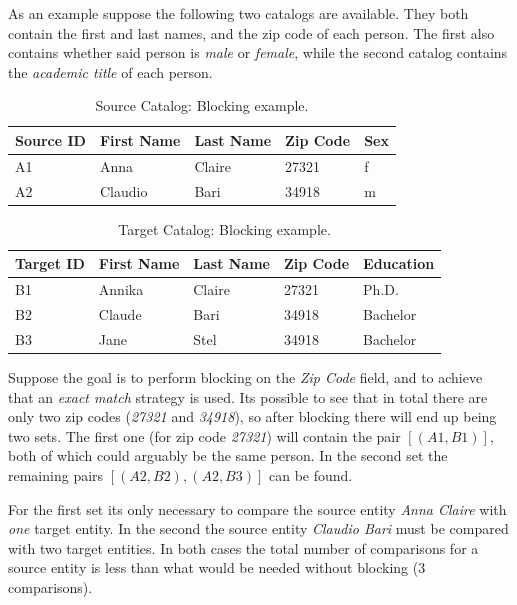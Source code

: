 \documentclass[epsfig,a4paper,11pt,titlepage,twoside,openany]{book}
\begin{document}
As an example suppose the following two catalogs are available. They both contain the
first and last names, and the zip code of each person. The first also contains
whether said person is \textit{male} or \textit{female}, while the second catalog
contains the \textit{academic title} of each person.

\begin{table}[H]
  \centering
  \begin{tabular}{l|l|l|l|l}
    Source ID & First Name & Last Name & Zip Code & Sex \\ \hline
    A1        & Anna       & Claire    & 27321    & f   \\
    A2        & Claudio    & Bari      & 34918    & m  
  \end{tabular}
  \caption{Source Catalog: Blocking example.}
  \label{tab:blocking-ex-source}
\end{table}

\begin{table}[H]
  \centering
  \begin{tabular}{l|l|l|l|l}
    Target ID & First Name & Last Name & Zip Code & Education \\ \hline
    B1        & Annika     & Claire    & 27321    & Ph.D.     \\
    B2        & Claude     & Bari      & 34918    & Bachelor  \\
    B3        & Jane       & Stel      & 34918    & Bachelor 
  \end{tabular}
  \caption{Target Catalog: Blocking example.}
  \label{tab:blocking-ex-target}
\end{table}

Suppose the goal is to perform blocking on the \textit{Zip Code} field, and to achieve that an
\textit{exact match} strategy is used. Its possible to see that in total there are only two zip
codes (\textit{27321} and \textit{34918}), so after blocking there will end up being two sets. The first one (for zip code \textit{27321}) will contain the pair
$[(A1, B1)]$, both of which could arguably be the same person. In the second set the remaining pairs $[(A2, B2), (A2, B3)]$ can be found.

For the first set its only necessary to compare the source entity \textit{Anna Claire}
with \textit{one} target entity. In the second the
source entity \textit{Claudio Bari} must be compared with two target entities. In both cases the
total number of comparisons for a source entity is less than what would be needed
without blocking (3 comparisons).
\end{document}
